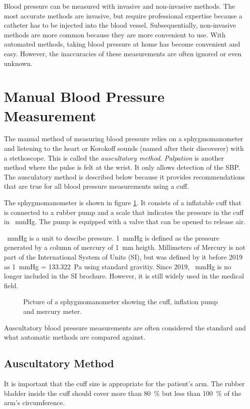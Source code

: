 Blood pressure can be measured with invasive and non-invasive methods. The most accurate methods are invasive, but require professional expertise because a catheter has to be injected into the blood vessel. Subsequentially, non-invasive methods are more common because they are more convenient to use. With automated methods, taking blood pressure at home has become convenient and easy. However, the inaccuracies of these measurements are often ignored or even unknown.

\section{Manual Blood Pressure Measurement}
The manual method of measuring blood pressure relies on a sphygmomanometer and listening to the heart or Korokoff sounds (named after their discoverer) with a stethoscope. This is called the \emph{auscultatory method}. \emph{Palpation} is another method where the pulse is felt at the wrist. It only allows detection of the SBP. The ausculatory method is described below because it provides recommendations that are true for all blood pressure measurements using a cuff. 

The sphygmomanometer is shown in figure \ref{fig:sphy}. It consists of a inflatable cuff that is connected to a rubber pump and a scale that indicates the pressure in the cuff in \SI{}{\mmHg}. The pump is equipped with a valve that can be opened to release air.


\SI{}{\mmHg} is a unit to descibe pressure. \SI{1}{\mmHg} is defined as the pressure generated by a column of mercury of \SI{1}{\mm} heigth. Millimeters of Mercury is not part of the International System of Units (SI), but was defined by it before 2019 as \SI{1}{\mmHg} = \SI{133.322}{\Pa} using standard gravitiy.\cite{SI2008} Since 2019, \SI{}{\mmHg} is no longer included in the SI brochure. However, it is still widely used in the medical field.
 
 
\begin{figure}[h]
\centering
\caption{Picture of a sphygmomanometer showing the cuff, inflation pump and mercury meter.}
\label{fig:sphy}
\end{figure}

Auscultatory blood pressure measurements are often considered the standard and what automatic methods are compared against. \cite{Sapinski1996}


\subsection{Auscultatory Method}
It is important that the cuff size is appropriate for the patient's arm. The rubber bladder inside the cuff should cover more than \SI{80}{\%} but less than \SI{100}{\%} of the arm's circumference.


